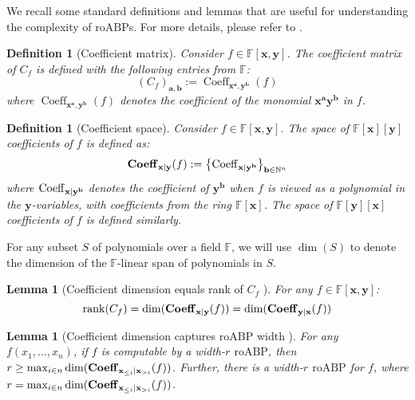 \documentclass[11pt]{article}
\newtheorem{lemma}[theorem]{Lemma}
\newtheorem{definition}[theorem]{Definition}
\newcommand{\F}{\mathbb{F}}
\newcommand{\roABP}{\mathrm{roABP}}
\begin{document}
We recall some standard definitions and lemmas that are useful for understanding the complexity of $\roABP$s. For more details, please refer to \cite{FSTW21,Forbes-thesis}.
\begin{definition}[Coefficient matrix]
    Consider $f \in \F[\mathbf{x},\mathbf{y}]$. The coefficient matrix of $C_f$ is defined with the following entries from $\F$: 
    $$(C_f)_{\mathbf{a},\mathbf{b}} := \operatorname{Coeff}_{\mathbf{x}^{\mathbf{a}},\mathbf{y}^{\mathbf{b}}}(f)$$
    where $\operatorname{Coeff}_{\mathbf{x}^{\mathbf{a}},\mathbf{y}^{\mathbf{b}}}(f)$ denotes the coefficient of the monomial $\mathbf{x}^{\mathbf{a}}\mathbf{y}^{\mathbf{b}}$ in $f$. 
\end{definition}

\begin{definition}[Coefficient space]
    Consider $f \in \F[\mathbf{x},\mathbf{y}]$. The \emph{space of $\F[\mathbf{x}][\mathbf{y}]$ coefficients of $f$} is defined as: $$ \operatorname{\mathbf{Coeff}}_{\mathbf{x}|\mathbf{y}}(f) := \left\{ \operatorname{Coeff}_{\mathbf{x}|\mathbf{y}^{\mathbf{b}}} \right\}_{\mathbf{b}\in \mathbb{N}^{n}}$$ where $\operatorname{Coeff}_{\mathbf{x}|\mathbf{y}^{\mathbf{b}}}$ denotes the coefficient of $\mathbf{y}^{\mathbf{b}}$ when $f$ is viewed as a polynomial in the $\mathbf{y}$-variables, with coefficients from the ring $\F[\mathbf{x}]$. The \emph{space of $\F[\mathbf{y}][\mathbf{x}]$ coefficients of $f$} is defined similarly.
\end{definition}

For any subset $S$ of polynomials over a field $\F$, we will use $\dim(S)$ to denote the dimension of the $\F$-linear span of polynomials in $S$. 

\begin{lemma}[Coefficient dimension equals rank of $C_f$ \cite{Nisan}]
    For any $f \in \F[\mathbf{x},\mathbf{y}]$: $$ \operatorname{rank}(C_f) = \dim(\operatorname{\mathbf{Coeff}}_{\mathbf{x}|\mathbf{y}}(f)) = \dim(\operatorname{\mathbf{Coeff}}_{\mathbf{y}|\mathbf{x}}(f))$$
\end{lemma}

\begin{lemma}[Coefficient dimension captures $\roABP$ width \cite{Nisan}\cite{Forbes-thesis}]\label{lem: nisan roabp width}
    For any $f(x_1, \dots, x_n)$, if $f$ is computable by a width-$r$ $\roABP$, then $r \geq \max_{i\in n} \dim(\operatorname{\mathbf{Coeff}}_{\mathbf{x}_{\leq i}|\mathbf{x}_{> i}}(f))$. Further, there is a width-$r$ $\roABP$ for $f$, where $r = \max_{i\in n} \dim(\operatorname{\mathbf{Coeff}}_{\mathbf{x}_{\leq i}|\mathbf{x}_{> i}}(f))$.
\end{lemma}
\end{document}
